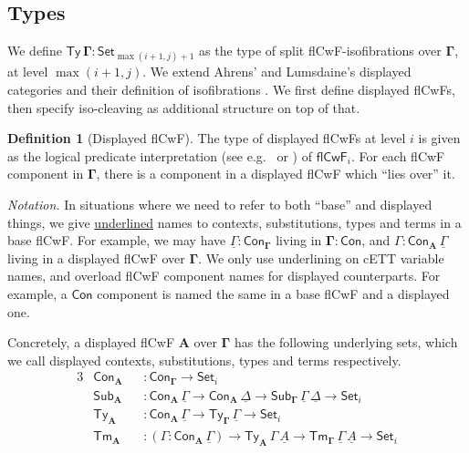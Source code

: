 \documentclass{article}
\theoremstyle{definition}
\newtheorem{definition}{Definition}
\theoremstyle{theorem}
\newcommand{\Con}{\mathsf{Con}}
\newcommand{\Sub}{\mathsf{Sub}}
\newcommand{\Tm}{\mathsf{Tm}}
\newcommand{\Ty}{\mathsf{Ty}}
\newcommand{\ra}{\rightarrow}
\newcommand{\Set}{\mathsf{Set}}
\newcommand{\flCwF}{\mathsf{flCwF}}
\newcommand{\bGamma}{\boldsymbol{\Gamma}}
\newcommand{\bA}{\boldsymbol{A}}
\newcommand{\ul}[1]{\underline{#1}}
\newcommand{\ulGamma}{\ul{\Gamma}}
\newcommand{\ulDelta}{\ul{\Delta}}
\newcommand{\ulA}{\ul{A}}
\begin{document}
\subsection{Types}

We define $\boldsymbol{\Ty\,\Gamma} : \Set_{\max(i+1, j)+1}$ as the type of
split flCwF-isofibrations over $\bGamma$, at level $\max(i+1, j)$. We extend
Ahrens' and Lumsdaine's displayed categories and their definition of
isofibrations \cite{displayedcats}.  We first define displayed flCwFs, then
specify iso-cleaving as additional structure on top of that.

\begin{definition}[Displayed flCwF]
The type of displayed flCwFs at level $i$ is given as the logical predicate
interpretation (see e.g.\ \cite{bernardy12parametricity} or \cite{hiit}) of
$\flCwF_i$. For each flCwF component in $\bGamma$, there is a component in a
displayed flCwF which ``lies over'' it.

\emph{Notation.} In situations where we need to refer to both ``base'' and
displayed things, we give \ul{underlined} names to contexts, substitutions,
types and terms in a base flCwF. For example, we may have $\ulGamma :
\Con_{\bGamma}$ living in $\boldsymbol{\Gamma : \Con}$, and $\Gamma :
\Con_{\bA}\,\ulGamma$ living in a displayed flCwF over $\bGamma$. We only use
underlining on cETT variable names, and overload flCwF component names for
displayed counterparts. For example, a $\Con$ component is named the same in
a base flCwF and a displayed one.

Concretely, a displayed flCwF $\bA$ over $\bGamma$ has the following underlying
sets, which we call displayed contexts, substitutions, types and terms
respectively.
\begin{alignat*}{3}
  & \Con_{\bA} && : \Con_{\bGamma}\ra \Set_i\\
  & \Sub_{\bA} && : \Con_{\bA}\,\ulGamma \ra \Con_{\bA}\,\ulDelta \ra \Sub_{\bGamma}\,\ulGamma\,\ulDelta \ra \Set_i \\
  & \Ty_{\bA}  && : \Con_{\bA}\,\ulGamma \ra \Ty_{\bGamma}\,\ulGamma \ra \Set_i\\
  & \Tm_{\bA}  && : (\Gamma : \Con_{\bA}\,\ulGamma)\ra \Ty_{\bA}\,\Gamma\,\ulA \ra \Tm_{\bGamma}\,\ulGamma\,\ulA \ra \Set_i
\end{alignat*}


\end{definition}
\end{document}
